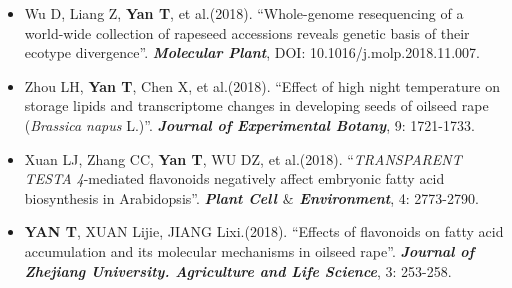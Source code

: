 %
%



\begin{itemize}
	\item Wu D, Liang Z, \textbf{Yan T}, et al.(2018). ``Whole-genome resequencing of a world-wide collection of rapeseed accessions reveals genetic basis of their ecotype divergence''. \textbf{\emph{Molecular Plant}}, DOI: 10.1016/j.molp.2018.11.007.
	
	\item Zhou LH, \textbf{Yan T}, Chen X, et al.(2018). ``Effect of high night temperature on storage lipids and transcriptome changes in developing seeds of oilseed rape (\emph{Brassica napus} L.)''. \textbf{\emph{Journal of Experimental Botany}}, 9: 1721-1733.
	
	\item Xuan LJ, Zhang CC, \textbf{Yan T}, WU DZ, et al.(2018). ``\emph{TRANSPARENT TESTA 4}-mediated flavonoids negatively affect embryonic fatty acid biosynthesis in Arabidopsis''. \textbf{\emph{Plant Cell $\&$ Environment}}, 4: 2773-2790.
	
	\item \textbf{YAN T}, XUAN Lijie, JIANG Lixi.(2018). ``Effects of flavonoids on fatty acid accumulation and its molecular mechanisms in oilseed rape''. \textbf{\emph{Journal of Zhejiang University. Agriculture and Life Science}}, 3: 253-258.

\end{itemize}
